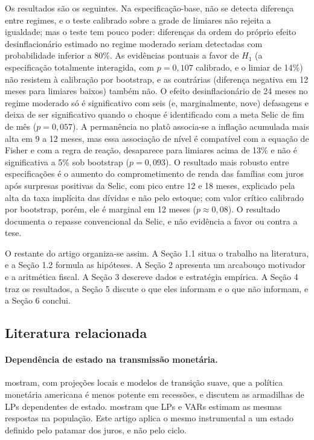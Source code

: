 \documentclass[12pt,a4paper]{article}
\begin{document}
Os resultados são os seguintes. Na especificação-base, não se detecta diferença entre regimes, e o teste calibrado sobre a grade de limiares não rejeita a igualdade; mas o teste tem pouco poder: diferenças da ordem do próprio efeito desinflacionário estimado no regime moderado seriam detectadas com probabilidade inferior a 80\%. As evidências pontuais a favor de $H_1$ (a especificação totalmente interagida, com $p = 0{,}107$ calibrado, e o limiar de 14\%) não resistem à calibração por bootstrap, e as contrárias (diferença negativa em 12 meses para limiares baixos) também não. O efeito desinflacionário de 24 meses no regime moderado só é significativo com seis (e, marginalmente, nove) defasagens e deixa de ser significativo quando o choque é identificado com a meta Selic de fim de mês ($p = 0{,}057$). A permanência no platô associa-se a inflação acumulada mais alta em 9 a 12 meses, mas essa associação de nível é compatível com a equação de Fisher e com a regra de reação, desaparece para limiares acima de 13\% e não é significativa a 5\% sob bootstrap ($p = 0{,}093$). O resultado mais robusto entre especificações é o aumento do comprometimento de renda das famílias com juros após surpresas positivas da Selic, com pico entre 12 e 18 meses, explicado pela alta da taxa implícita das dívidas e não pelo estoque; com valor crítico calibrado por bootstrap, porém, ele é marginal em 12 meses ($p \approx 0{,}08$). O resultado documenta o repasse convencional da Selic, e não evidência a favor ou contra a tese.

O restante do artigo organiza-se assim. A Seção 1.1 situa o trabalho na literatura, e a Seção 1.2 formula as hipóteses. A Seção 2 apresenta um arcabouço motivador e a aritmética fiscal. A Seção 3 descreve dados e estratégia empírica. A Seção 4 traz os resultados, a Seção 5 discute o que eles informam e o que não informam, e a Seção 6 conclui.

\subsection{Literatura relacionada}

\paragraph{Dependência de estado na transmissão monetária.} \citet{tenreyro2016pushing} mostram, com projeções locais e modelos de transição suave, que a política monetária americana é menos potente em recessões, e \citet{ramey2018government} discutem as armadilhas de LPs dependentes de estado. \citet{plagborg2021local} mostram que LPs e VARs estimam as mesmas respostas na população. Este artigo aplica o mesmo instrumental a um estado definido pelo patamar dos juros, e não pelo ciclo.
\end{document}
